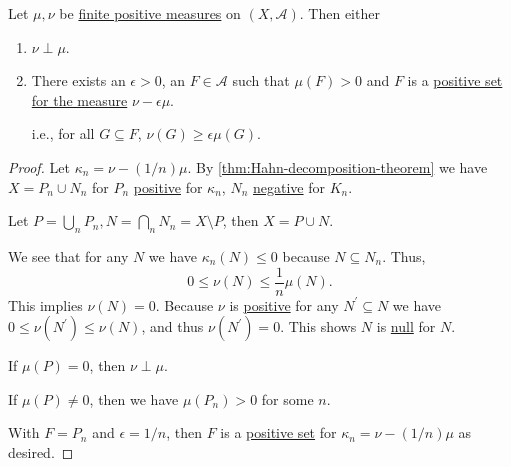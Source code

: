 \begin{lemma}\label{lma:finite-singular}
	Let \(\mu, \nu\) be \hyperref[def:finite-signed-measure]{finite positive measures} on \((X, \mathcal{A})\). Then either
	\begin{enumerate}
		\item \(\nu \perp \mu\).
		\item There exists an \(\epsilon > 0\), an \(F \in \mathcal{A}\) such that \(\mu(F) > 0\) and \(F\) is a
		      \hyperref[def:positive-set-for-a-signed-measure]{positive set for the measure} \(\nu - \epsilon \mu\).

		      i.e., for all \(G \subseteq F\), \(\nu(G) \geq \epsilon \mu(G)\).
	\end{enumerate}
\end{lemma}

\begin{proof}
	Let \(\kappa_n = \nu - (1/n)\mu\). By \autoref{thm:Hahn-decomposition-theorem} we have \(X = P_n \cup N_n\) for \(P_n\) \hyperref[def:positive-set-for-a-signed-measure]{positive} for \(\kappa_n\),
	\(N_n\) \hyperref[def:negative-set-for-a-signed-measure]{negative} for \(K_n\).

	Let \(P = \bigcup_n P_n, N = \bigcap_n N_n = X \setminus P\), then \(X = P \cup N\).

	We see that for any \(N\) we have \(\kappa_n(N) \leq 0\) because \(N \subseteq N_n\). Thus,
	\[
		0 \leq \nu(N) \leq \frac{1}{n}\mu(N).
	\]
	This implies \(\nu(N) = 0\). Because \(\nu\) is \hyperref[def:signed-measure]{positive} for any \(N^\prime  \subseteq N\) we have \(0 \leq \nu(N^\prime ) \leq \nu(N)\),
	and thus \(\nu(N^\prime ) = 0\). This shows \(N\) is \hyperref[def:null-set-for-a-signed-measure]{null} for \(N\).

	If \(\mu(P) = 0\), then \(\nu \perp \mu\).

	If \(\mu(P) \neq 0\), then we have \(\mu(P_n) > 0\) for some \(n\).

	With \(F = P_n\) and \(\epsilon = 1/n\), then \(F\) is a \hyperref[def:positive-set-for-a-signed-measure]{positive set} for \(\kappa_n = \nu - (1/n)\mu\) as desired.
\end{proof}

